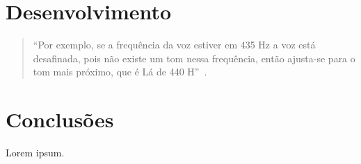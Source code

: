 \documentclass{sbrt}
\begin{document}

\section{Desenvolvimento}

\begin{quote}
  ``Por exemplo, se a frequência da voz estiver em 435 Hz a voz está desafinada, pois não existe um tom nessa frequência, então ajusta-se para o tom mais próximo, que é Lá de 440 H''~\cite{deimplementaccao}.
\end{quote}


\section{Conclusões}

Lorem ipsum.





\end{document}
